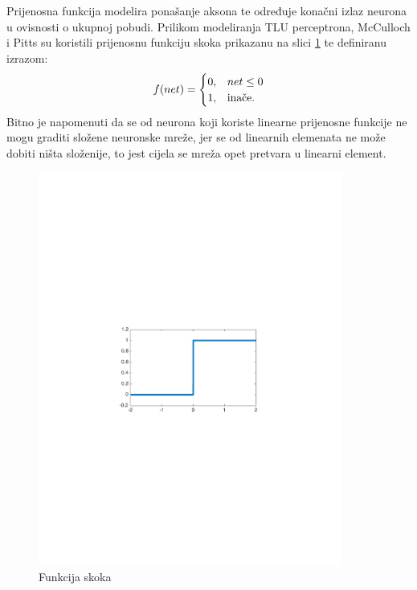 Prijenosna funkcija  modelira ponašanje aksona te određuje konačni izlaz neurona u ovisnosti o ukupnoj pobudi. Prilikom modeliranja TLU perceptrona, McCulloch i Pitts su koristili prijenosnu funkciju skoka prikazanu na slici \ref{fig:step} te definiranu izrazom:
\[
  f(net) = \left\{\def\arraystretch{1.2}%
  \begin{array}{@{}c@{\quad}l@{}}
    0, & \text{$net \leq 0$} \\
    1, & \text{inače.}\\
  \end{array}\right.
\]
Bitno je napomenuti da se od neurona koji koriste linearne prijenosne funkcije ne mogu graditi složene neuronske mreže, jer se od linearnih elemenata ne može dobiti ništa složenije, to jest cijela se mreža opet pretvara u linearni element.
\begin{figure}[htb]
    \centering
    \includegraphics[width=10cm]{images/step.pdf}
    \caption{Funkcija skoka}
    \label{fig:step}
\end{figure}


